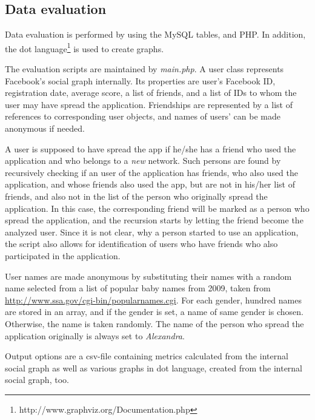 \documentclass[preprint,12pt]{elsarticle}
\begin{document}
\subsection{Data evaluation}
\label{sec:data-evaluation}
Data evaluation is performed by using the MySQL tables, and
PHP. In addition, the dot
language\footnote{http://www.graphviz.org/Documentation.php} is used
to create graphs. 


The evaluation scripts are maintained by \textit{main.php}. A user
class represents Facebook's social graph internally. Its properties
are user's Facebook ID, registration date, average score, a list of
friends, and a list of IDs to whom the user may have spread the
application. Friendships are represented by a list of references to corresponding
user objects, and names of users' can be made anonymous if needed.

A user is supposed to have spread the app if he/she has
a friend who used the application and who belongs to a \textit{new}
network. Such persons are found by recursively checking if an user of
the application has friends, who also used the application, and whose friends
also used the app, but are not in his/her list of friends, and also not in the list of the person
who originally spread the application. In this case, the corresponding
friend will be marked as a person who spread the application, and the
recursion starts by letting the friend become the analyzed user.
Since it is not clear, why a person started to use an application, the
script also allows for identification of users who have friends 
who also participated in the application. 

User names are made anonymous by substituting their names with a
random name selected from a list of popular baby names
from 2009, taken from \url{http://www.ssa.gov/cgi-bin/popularnames.cgi}.   
For each gender, hundred names are stored in an array, and if the
gender is set, a name of same gender is chosen. Otherwise, the name is
taken randomly. The name of the person who spread the application
originally is always set to \textit{Alexandra}.

Output options are a \ac{csv}-file containing metrics calculated from
the internal social graph as well as various graphs in dot language, created
from the internal social graph, too.
\end{document}
